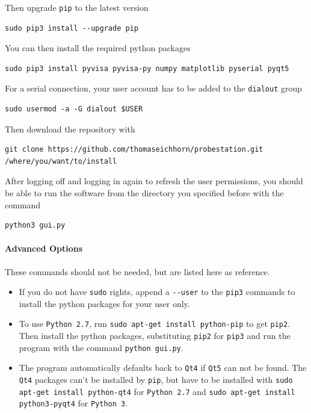 \documentclass[a4paper]{article}
\begin{document}
Then upgrade {\tt pip} to the latest version

\medskip
\begin{lstlisting}
sudo pip3 install --upgrade pip
\end{lstlisting}
\medskip

You can then install the required python packages

\medskip
\begin{lstlisting}
sudo pip3 install pyvisa pyvisa-py numpy matplotlib pyserial pyqt5
\end{lstlisting}
\medskip

For a serial connection, your user account has to be added to the {\tt dialout} group

\medskip
\begin{lstlisting}
sudo usermod -a -G dialout $USER
\end{lstlisting}
\medskip

Then download the repository with

\medskip
\begin{lstlisting}
git clone https://github.com/thomaseichhorn/probestation.git /where/you/want/to/install
\end{lstlisting}
\medskip

After logging off and logging in again to refresh the user permissions, you should be able to run the software from the directory you specified before with the command

\medskip
\begin{lstlisting}
python3 gui.py
\end{lstlisting}
\medskip

\paragraph{Advanced Options\\}
These commands should not be needed, but are listed here as reference.

\begin{itemize}
\item{} If you do not have {\tt sudo} rights, append a {\tt -{}-user} to the {\tt pip3} commands to install the python packages for your user only.

\item{} To use {\tt Python 2.7}, run {\tt sudo apt-get install python-pip} to get {\tt pip2}.
Then install the python packages, substituting {\tt pip2} for {\tt pip3} and run the program with the command {\tt python gui.py}.

\item{} The program automatically defaults back to {\tt Qt4} if {\tt Qt5} can not be found.
The {\tt Qt4} packages can't be installed by {\tt pip}, but have to be installed with {\tt sudo apt-get install python-qt4} for {\tt Python 2.7} and {\tt sudo apt-get install python3-pyqt4} for {\tt Python 3}.
\end{itemize}
\end{document}
